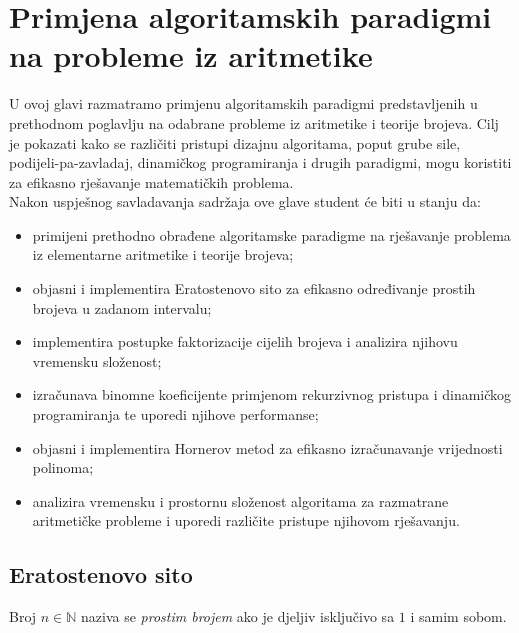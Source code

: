 \chapter[Primjena algoritamskih paradigmi na probleme iz aritmetike]{Primjena algoritamskih paradigmi na probleme iz aritmetike}

U ovoj glavi razmatramo primjenu algoritamskih paradigmi predstavljenih u prethodnom poglavlju na odabrane probleme iz aritmetike i teorije brojeva. Cilj je pokazati kako se različiti pristupi dizajnu algoritama, poput grube sile, podijeli-pa-zavladaj, dinamičkog programiranja i drugih paradigmi, mogu koristiti za efikasno rješavanje matematičkih problema.\\


Nakon uspješnog savladavanja sadržaja ove glave student će biti u stanju da:

\begin{itemize}
	\item primijeni prethodno obrađene algoritamske paradigme na rješavanje
	problema iz elementarne aritmetike i teorije brojeva;
	
	\item objasni i implementira Eratostenovo sito za efikasno određivanje
	prostih brojeva u zadanom intervalu;
	
	\item implementira postupke faktorizacije cijelih brojeva i analizira
	njihovu vremensku složenost;
	
	\item izračunava binomne koeficijente primjenom rekurzivnog pristupa
	i dinamičkog programiranja te uporedi njihove performanse;
	
	\item objasni i implementira Hornerov metod za efikasno izračunavanje
	vrijednosti polinoma;
	
	\item analizira vremensku i prostornu složenost algoritama za razmatrane
	aritmetičke probleme i uporedi različite pristupe njihovom rješavanju.
\end{itemize}

\section{Eratostenovo sito}

\begin{definition}
	Broj $n \in \mathbb{N}$ naziva se \textit{prostim brojem} ako je djeljiv isključivo sa $1$ i samim sobom.
\end{definition}

